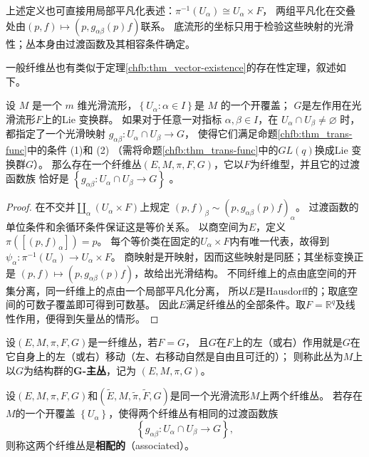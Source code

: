 上述定义也可直接用局部平凡化表述：$\pi^{-1}(U_\alpha)\cong U_\alpha\times F$，
两组平凡化在交叠处由$(p,f)\mapsto(p,g_{\alpha\beta}(p)f)$联系。
底流形的坐标只用于检验这些映射的光滑性；丛本身由过渡函数及其相容条件确定。

一般纤维丛也有类似于定理\ref{chfb:thm_vector-existence}的存在性定理，叙述如下。

\begin{theorem}\label{chfb:thm_fb-existence}
    设 $M$ 是一个 $m$ 维光滑流形，$\left\{U_\alpha: \alpha \in I\right\}$是 $M$ 的一个开覆盖；
    $G$是左作用在光滑流形$F$上的Lie 变换群。
    如果对于任意一对指标 $\alpha, \beta \in I$，在 $U_\alpha \cap U_\beta \neq \varnothing$ 时，
    都指定了一个光滑映射 $g_{\alpha \beta}: U_\alpha \cap U_\beta \rightarrow G$，
    使得它们满足命题\ref{chfb:thm_trans-func}中的条件 (1)和 (2)
    （需将命题\ref{chfb:thm_trans-func}中的$GL(q)$换成Lie 变换群$G$）。
    那么存在一个纤维丛$(E,M,\pi,F,G)$，它以$F$为纤维型，并且它的过渡函数族
    恰好是 $\left\{g_{\alpha \beta}: U_\alpha \cap U_\beta \rightarrow G\right\}$ 。
\end{theorem}

\begin{proof}
    在不交并$\coprod_\alpha(U_\alpha\times F)$上规定
    $(p,f)_\beta\sim(p,g_{\alpha\beta}(p)f)_\alpha$。
    过渡函数的单位条件和余循环条件保证这是等价关系。
    以商空间为$E$，定义$\pi([(p,f)_\alpha])=p$。
    每个等价类在固定的$U_\alpha\times F$内有唯一代表，故得到
    $\psi_\alpha:\pi^{-1}(U_\alpha)\to U_\alpha\times F$。
    商映射是开映射，因而这些映射是同胚；其坐标变换正是
    $(p,f)\mapsto(p,g_{\alpha\beta}(p)f)$，故给出光滑结构。
    不同纤维上的点由底空间的开集分离，同一纤维上的点由一个局部平凡化分离，
    所以$E$是Hausdorff的；取底空间的可数子覆盖即可得到可数基。
    因此$E$满足纤维丛的全部条件。取$F=\mathbb R^q$及线性作用，便得到矢量丛的情形。
\end{proof}

\begin{definition}
    设$(E, M, \pi, F, G)$是一纤维丛，若$F=G$，
    且$G$在$F$上的左（或右）作用就是$G$在它自身上的左（或右）移动（左、右移动自然是自由且可迁的）；
    则称此丛为$M$上以$G$为结构群的\textbf{G-主丛}，记为 $(E, M, \pi, G)$。
\end{definition}

\begin{definition}\label{chfb:def_associated}
    设$(E, M, \pi, F, G)$和$(\widetilde{E}, M, \tilde{\pi}, \widetilde{F}, G)$是同一个光滑流形$M$上两个纤维丛。
    若存在$M$的一个开覆盖 $\left\{U_\alpha\right\}$，使得两个纤维丛有相同的过渡函数族
    \[
        \left\{g_{\alpha \beta}:U_\alpha \cap U_\beta \rightarrow G\right\},
    \]
    则称这两个纤维丛是\textbf{相配的}（associated）。
\end{definition}

